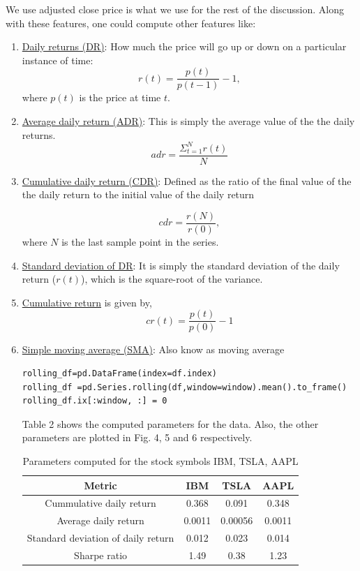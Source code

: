\documentclass[12pt]{article}
\begin{document}
\begin{itemize}
We use adjusted close price is what we use for the rest of the discussion. Along with these features, one could compute other features like:

\begin{enumerate}
 \item \underline{Daily returns (DR)}: How much the price will go up or down on a particular instance of time:
\[ r(t)=\frac{p(t)}{p(t-1)}-1,
\]
where $p(t)$ is the price at time $t$.
\item \underline{Average daily return (ADR)}: This is simply the average value of the the daily returns.
\[ adr = \frac{\Sigma_{t=1}^{N} r(t)}{N}\]

\item \underline {Cumulative daily return (CDR)}: Defined as the ratio of the final value of the the daily return to the initial value of the daily return 

\[ cdr= \frac{r(N)}{r(0)},\] where $N$ is the last sample point in the series.

\item \underline {Standard deviation of DR}: It is simply the standard deviation of the daily return ($r(t)$), which is the square-root of the variance.

\item\underline{Cumulative return} is given by,
\[ cr(t)=\frac{p(t)}{p(0)}-1
\]
\item \underline{Simple moving average (SMA)}: Also know as moving average
  {\small \begin{verbatim}
rolling_df=pd.DataFrame(index=df.index)
rolling_df =pd.Series.rolling(df,window=window).mean().to_frame() 
rolling_df.ix[:window, :] = 0
 \end{verbatim}
}

Table 2 shows the computed parameters for the data. Also, the other parameters are plotted in Fig. 4, 5 and 6 respectively.
\begin{table}
\begin{center}
\begin{tabular} {|c|c|c|c|}
\hline \hline
\textbf{Metric} & \textbf{IBM} & \textbf{TSLA} & \textbf{AAPL} \\ \hline
Cummulative daily return & 0.368 & 0.091 & 0.348 \\ \hline
Average daily return & 0.0011 & 0.00056 & 0.0011\\ \hline
Standard deviation of daily return  & 0.012 & 0.023 & 0.014  \\ \hline
Sharpe ratio & 1.49 & 0.38 & 1.23 \\ \hline
\hline
\end{tabular}
\end{center}
\caption{Parameters computed for the stock symbols IBM, TSLA, AAPL}
\end{table}


\end{enumerate}
\end{itemize}
\end{document}
